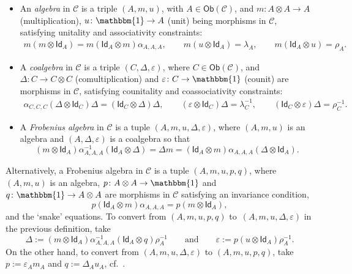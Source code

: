 \documentclass[pdftex]{sigma}
\numberwithin{equation}{section}
\newcommand{\ide}{\mathsf{Id}}
\newcommand{\Ob}{\mathsf{Ob}}
\newcommand{\cC}{\mathcal{C}}
\begin{document}
\begin{Definition} \label{def:co-alg-Frob}\quad
\begin{itemize}\itemsep=0pt
 \item[(a)] An \textit{algebra} in $\cC$ is a triple $( A,m,u)$, with $A \in \Ob (\cC)$, and $m \colon A \otimes A \to A$ (multiplication), $u \colon \mathbbm{1} \to A$ (unit) being morphisms in $\cC$,
 satisfying unitality and associativity constraints:
 \begin{align*}
 m (m \otimes \ide_A) = m(\ide_A \otimes m) \alpha_{A,A,A}, \qquad
 m (u \otimes \ide_A) = \lambda_A, \qquad m(\ide_A \otimes u) = \rho_A.
 \end{align*}

 \item[(b)] A \textit{coalgebra} in $\cC$ is a triple $( C,\Delta,\varepsilon)$, where $C \in \Ob(\cC)$, and $\Delta \colon C \to C \otimes C$ (comultiplication) and $\varepsilon \colon C \to \mathbbm{1}$ (counit) are morphisms in $\cC$,
 satisfying counitality and coassociativity constraints:
 \begin{align*}
 \alpha_{C,C,C}(\Delta \otimes \ide_C) \Delta = (\ide_C \otimes \Delta)\Delta, \qquad
 (\varepsilon \otimes \ide_C)\Delta = \lambda_C^{-1}, \qquad (\ide_C \otimes \varepsilon)\Delta = \rho_C^{-1}.
 \end{align*}

 \item[(c)] A \textit{Frobenius algebra} in $\cC$ is a tuple $ ( A, m, u, \Delta, \varepsilon )$, where
 $( A,m,u)$ is an algebra and $ ( A,\Delta,\varepsilon )$ is a coalgebra so that
 \begin{equation*}
 ( m \otimes \ide_A ) \alpha^{-1}_{A,A,A} ( \ide_A \otimes \Delta )=\Delta m = ( \ide_A \otimes m ) \alpha_{A,A,A} ( \Delta \otimes \ide_A ).
 \end{equation*}
\end{itemize}
\end{Definition}

\begin{Remark} \label{rem:Frobpairing}
 Alternatively, a Frobenius algebra in $\cC$ is a tuple $ ( A,m,u,p,q )$, where $ ( A, m, u )$ is an algebra, $p \colon A \otimes A \to \mathbbm{1}$ and $q \colon \mathbbm{1} \to A \otimes A$ are morphisms in $\cC$ satisfying an invariance condition,
 \[
 p ( \ide_A \otimes m ) \alpha_{A,A,A} = p ( m \otimes \ide_A ),
 \]
 and the `snake' equations.
To convert from $ ( A,m,u,p,q )$ to~$ ( A,m,u,\Delta,\varepsilon )$ in the previous definition, take
\[
\Delta:= ( m \otimes \ide_A )\alpha_{A,A,A}^{-1} (\ide_A \otimes q )\rho_A^{-1} \qquad \text{and} \qquad {\varepsilon:=p (u \otimes \ide_A)\rho_A^{-1}}.
\]
On the other hand, to convert from $( A,m,u,\Delta,\varepsilon )$ to $( A,m,u,p,q)$, take
$p:= \varepsilon_A m_A$ and $q:= \Delta_A u_A$, cf.\ \cite{FS}.
\end{Remark}
\end{document}
